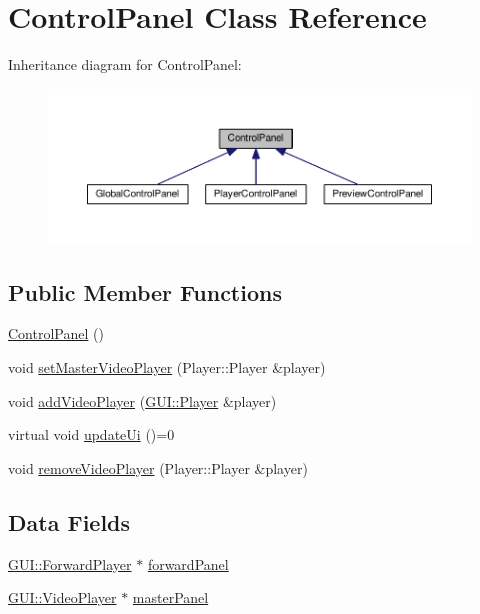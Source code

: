 \hypertarget{classGUI_1_1ControlPanel}{}\section{Control\+Panel Class Reference}
\label{classGUI_1_1ControlPanel}


Inheritance diagram for Control\+Panel\+:
\nopagebreak
\begin{figure}[H]
\begin{center}
\leavevmode
\includegraphics[width=350pt]{classGUI_1_1ControlPanel__inherit__graph}
\end{center}
\end{figure}
\subsection*{Public Member Functions}
\begin{DoxyCompactItemize}
\item 
\hyperlink{classGUI_1_1ControlPanel_a0efa607fe77b973e1128eae3bb33a9a1}{Control\+Panel} ()
\item 
void \hyperlink{classGUI_1_1ControlPanel_a798f5ffd7fe32e3fe8f67feed1e555c4}{set\+Master\+Video\+Player} (Player\+::\+Player \&player)
\item 
void \hyperlink{classGUI_1_1ControlPanel_a1a372b46dee9c1f2b2696337231b3add}{add\+Video\+Player} (\hyperlink{classGUI_1_1Player}{G\+U\+I\+::\+Player} \&player)
\item 
virtual void \hyperlink{classGUI_1_1ControlPanel_aa9963358cf9cff5ea2531d73efa78f73}{update\+Ui} ()=0
\item 
void \hyperlink{classGUI_1_1ControlPanel_aa24579c43e90697b0b05662270dfca3f}{remove\+Video\+Player} (Player\+::\+Player \&player)
\end{DoxyCompactItemize}
\subsection*{Data Fields}
\begin{DoxyCompactItemize}
\item 
\hyperlink{classGUI_1_1ForwardPlayer}{G\+U\+I\+::\+Forward\+Player} $\ast$ \hyperlink{classGUI_1_1ControlPanel_a15dc5e66f941f96f5b10d4da627f7f4e}{forward\+Panel}
\item 
\hyperlink{classGUI_1_1VideoPlayer}{G\+U\+I\+::\+Video\+Player} $\ast$ \hyperlink{classGUI_1_1ControlPanel_a5e72764e084c40951f89250eea333664}{master\+Panel}
\end{DoxyCompactItemize}
